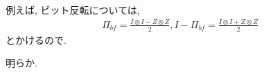 \begin{ex}
    \label{ex12.32}
    例えば, ビット反転については, 
    \begin{align*}
        \Pi_{bf} = \frac{I \otimes I - Z \otimes Z}{2}, I - \Pi_{bf} = \frac{I \otimes I + Z \otimes Z}{2}
    \end{align*}
    とかけるので.
\end{ex}

\begin{ex}
    \label{ex12.33}
\end{ex}

\begin{ex}
    \label{ex12.34}
\end{ex}

\begin{ex}
    \label{ex12.35}
\end{ex}

\begin{ex}
    \label{ex12.36}
    明らか.
\end{ex}